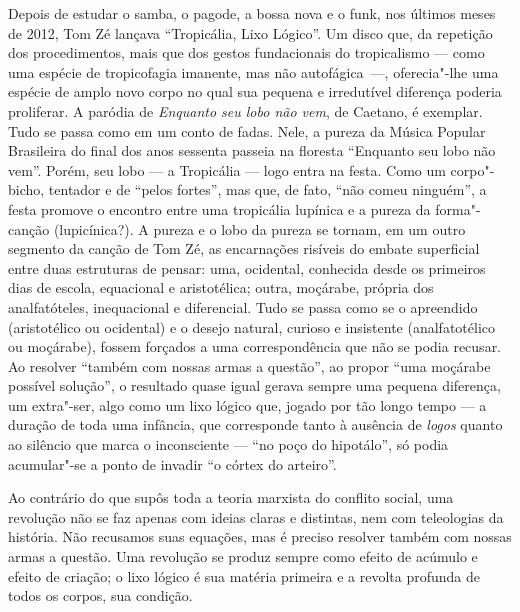 Depois de estudar o samba, o pagode, a bossa nova
e o funk, nos últimos meses de 2012, Tom Zé lançava ``Tropicália, Lixo
Lógico''. Um disco que, da repetição dos procedimentos, mais que dos
gestos fundacionais do tropicalismo --- como uma espécie de tropicofagia
imanente, mas não autofágica~---, oferecia"-lhe uma espécie de amplo novo
corpo no qual sua pequena e irredutível diferença poderia proliferar. A
paródia de \emph{Enquanto seu lobo não vem}, de Caetano, é exemplar.
Tudo se passa como em um conto de fadas. Nele, a pureza da Música
Popular Brasileira do final dos anos sessenta passeia na floresta
``Enquanto seu lobo não vem''. Porém, seu lobo --- a Tropicália --- logo
entra na festa. Como um corpo"-bicho, tentador e de ``pelos fortes'', mas
que, de fato, ``não comeu ninguém'', a festa promove o encontro entre
uma tropicália lupínica e a pureza da forma"-canção (lupicínica?). A
pureza e o lobo da pureza se tornam, em um outro segmento da canção de
Tom Zé, as encarnações risíveis do embate superficial entre duas
estruturas de pensar: uma, ocidental, conhecida desde os primeiros dias
de escola, equacional e aristotélica; outra, moçárabe, própria dos
analfatóteles, inequacional e diferencial. Tudo se passa como se o
apreendido (aristotélico ou ocidental) e o desejo natural, curioso e
insistente (analfatotélico ou moçárabe), fossem forçados a uma
correspondência que não se podia recusar. Ao resolver ``também com
nossas armas a questão'', ao propor ``uma moçárabe possível solução'', o
resultado quase igual gerava sempre uma pequena diferença, um extra"-ser,
algo como um lixo lógico que, jogado por tão longo tempo --- a duração de
toda uma infância, que corresponde tanto à ausência de \emph{logos}
quanto ao silêncio que marca o inconsciente --- ``no poço do hipotálo'',
só podia acumular"-se a ponto de invadir ``o córtex do arteiro''.

Ao contrário do que supôs toda a teoria marxista do conflito social, uma
revolução não se faz apenas com ideias claras e distintas, nem com
teleologias da história. Não recusamos suas equações, mas é preciso
resolver também com nossas armas a questão. Uma revolução se produz
sempre como efeito de acúmulo e efeito de criação; o lixo lógico é sua
matéria primeira e a revolta profunda de todos os corpos, sua condição.

